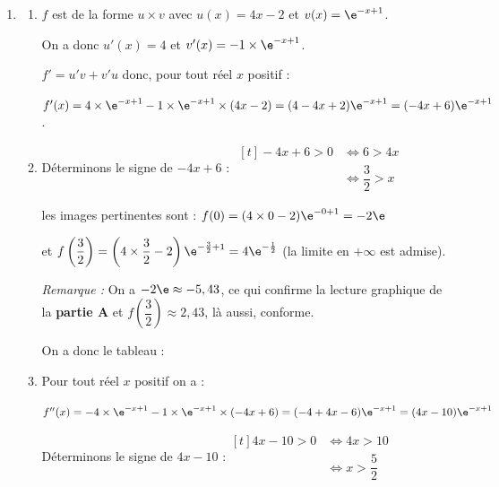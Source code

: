 \begin{enumerate}
	\item
	\begin{enumerate}
		\item  $f$ est de la forme $u\times v$ avec $u(x)=4x-2$ et $v(x)=\e^{-x+1}$.

		On a donc $u'(x)= 4$ et $v'(x)=-1 \times \e^{-x+1}$.

		$f'= u'v + v'u$ donc, pour tout réel $x$ positif :

		 $f'(x) = 4 \times \e^{-x+1} -1 \times \e^{-x+1} \times (4x-2)= (4-4x+2)\e^{-x+1} = (-4x+6)\e^{-x+1}$.

		\item  Déterminons le signe de $-4x+6$ : \quad $\begin{aligned}[t] -4x+6 >0 &\iff  6 > 4x \\
		&\iff \dfrac{3}{2}>x\end{aligned}$

		les images pertinentes sont : \quad
		$f(0)= (4\times 0 -2) \e ^{-0+1}= -2\e$

		et \quad
		$f\left( \dfrac{3}{2}\right)=  \left(4 \times \dfrac{3}{2}-2\right)\e^{-\frac{3}{2}+1}=4\e^{-\frac{1}{2}}$ \quad (la limite en $+\infty$ est admise).

		\emph{Remarque :} On a $-2\e \approx -5,43$, ce qui confirme la lecture graphique de la \textbf{partie A} \linebreak et $ f\left(\dfrac{3}{2}\right)\approx 2,43 $, là aussi, conforme.


		On a donc le tableau :

		\begin{center}
		\end{center}


		\item  Pour tout réel $x$ positif on a :

		$f''(x)= -4 \times \e^{-x+1} -1 \times \e^{-x+1} \times (-4x+6)= (-4+4x-6)\e^{-x+1}= (4x-10)\e^{-x+1}$


		Déterminons le signe de  $4x-10$ :\quad $\begin{aligned}[t] 4x-10 >0 &\iff  4x > 10 \\
		&\iff x>\dfrac{5}{2}\end{aligned}$


\end{enumerate}
\end{enumerate}
